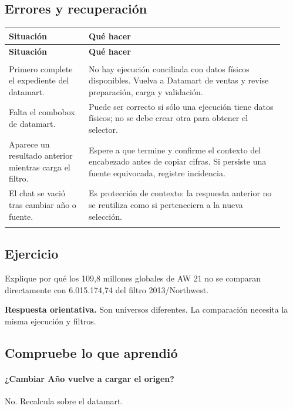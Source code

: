 \subsection{Errores y recuperación}
\begingroup
\fontsize{10}{12.5}\selectfont
\setlength{\tabcolsep}{5pt}
\renewcommand{\arraystretch}{1.15}
\begin{longtable}{@{}>{\RaggedRight\arraybackslash}p{0.27\linewidth}>{\RaggedRight\arraybackslash}p{0.66\linewidth}@{}}
\toprule
\textbf{Situación} & \textbf{Qué hacer} \\
\midrule
\endfirsthead
\toprule
\textbf{Situación} & \textbf{Qué hacer} \\
\midrule
\endhead
\midrule
\multicolumn{2}{r}{\footnotesize Continúa en la página siguiente}\\
\endfoot
\bottomrule
\endlastfoot
Primero complete el expediente del datamart. & No hay ejecución conciliada con datos físicos disponibles. Vuelva a Datamart de ventas y revise preparación, carga y validación. \\
\addlinespace[3pt]
Falta el combobox de datamart. & Puede ser correcto si sólo una ejecución tiene datos físicos; no se debe crear otra para obtener el selector. \\
\addlinespace[3pt]
Aparece un resultado anterior mientras carga el filtro. & Espere a que termine y confirme el contexto del encabezado antes de copiar cifras. Si persiste una fuente equivocada, registre incidencia. \\
\addlinespace[3pt]
El chat se vació tras cambiar año o fuente. & Es protección de contexto: la respuesta anterior no se reutiliza como si perteneciera a la nueva selección. \\
\addlinespace[3pt]
\end{longtable}
\endgroup

\subsection{Ejercicio}
Explique por qué los 109,8 millones globales de AW 21 no se comparan directamente con 6.015.174,74 del filtro 2013/Northwest.

\textbf{Respuesta orientativa.} Son universos diferentes. La comparación necesita la misma ejecución y filtros.

\subsection{Compruebe lo que aprendió}
\paragraph{¿Cambiar Año vuelve a cargar el origen?} No. Recalcula sobre el datamart.

